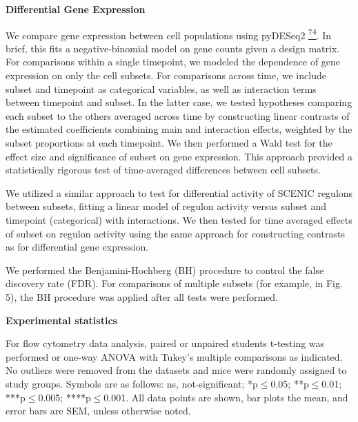 \textbf{Differential Gene Expression}

We compare gene expression between cell populations using pyDESeq2
\href{https://sciwheel.com/work/citation?ids=15335444\&pre=\&suf=\&sa=0\&dbf=0}{\textsuperscript{74}}.
In brief, this fits a negative-binomial model on gene counts given a
design matrix. For comparisons within a single timepoint, we modeled the
dependence of gene expression on only the cell subsets. For comparisons
across time, we include subset and timepoint as categorical variables,
as well as interaction terms between timepoint and subset. In the latter
case, we tested hypotheses comparing each subset to the others averaged
across time by constructing linear contrasts of the estimated
coefficients combining main and interaction effects, weighted by the
subset proportions at each timepoint. We then performed a Wald test for
the effect size and significance of subset on gene expression. This
approach provided a statistically rigorous test of time-averaged
differences between cell subsets.

We utilized a similar approach to test for differential activity of
SCENIC regulons between subsets, fitting a linear model of regulon
activity versus subset and timepoint (categorical) with interactions. We
then tested for time averaged effects of subset on regulon activity
using the same approach for constructing contrasts as for differential
gene expression.

We performed the Benjamini-Hochberg (BH) procedure to control the false
discovery rate (FDR). For comparisons of multiple subsets (for example,
in Fig. 5), the BH procedure was applied after all tests were performed.

\textbf{Experimental statistics}

For flow cytometry data analysis, paired or unpaired students t-testing
was performed or one-way ANOVA with Tukey's multiple comparisons as
indicated. No outliers were removed from the datasets and mice were
randomly assigned to study groups. Symbols are as follows: ns,
not-significant; *p$\leq$0.05; **p$\leq$0.01; ***p$\leq$0.005; ****p$\leq$0.001. All data
points are shown, bar plots the mean, and error bars are SEM, unless
otherwise noted.~

